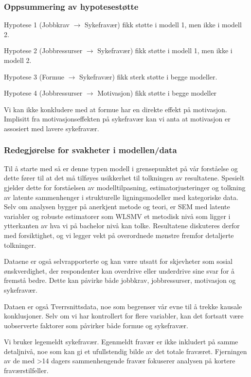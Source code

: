 \documentclass[
  12pt,
  a4paper,
  DIV=11,
  numbers=noendperiod]{scrartcl}
\begin{document}
\subsubsection{Oppsummering av
hypotesestøtte}\label{oppsummering-av-hypotesestuxf8tte}

Hypotese 1 (Jobbkrav \(\rightarrow\) Sykefravær) fikk støtte i modell 1,
men ikke i modell 2.

Hypotese 2 (Jobbressurser \(\rightarrow\) Sykefravær) fikk støtte i
modell 1, men ikke i modell 2.

Hypotese 3 (Formue \(\rightarrow\) Sykefravær) fikk sterk støtte i begge
modeller.

Hypotese 4 (Jobbressurser \(\rightarrow\) Motivasjon) fikk støtte i
begge modeller

Vi kan ikke konkludere med at formue har en direkte effekt på
motivasjon. Implisitt fra motivasjonseffekten på sykefravær kan vi anta
at motivasjon er assosiert med lavere sykefravær.

\subsubsection{Redegjørelse for svakheter i
modellen/data}\label{redegjuxf8relse-for-svakheter-i-modellendata}

Til å starte med så er denne typen modell i grensepunktet på vår
forståelse og dette fører til at det må tilføyes usikkerhet til
tolkningen av resultatene. Spesielt gjelder dette for forståelsen av
modelltilpasning, estimatorjusteringer og tolkning av latente
sammenhenger i strukturelle ligningsmodeller med kategoriske data. Selv
om analysen bygger på anerkjent metode og teori, er SEM med latente
variabler og robuste estimatorer som WLSMV et metodisk nivå som ligger i
ytterkanten av hva vi på bachelor nivå kan tolke. Resultatene diskuteres
derfor med forsiktighet, og vi legger vekt på overordnede mønstre
fremfor detaljerte tolkninger.

Dataene er også selvrapporterte og kan være utsatt for skjevheter som
sosial ønskverdighet, der respondenter kan overdrive eller underdrive
sine svar for å fremstå bedre. Dette kan påvirke både jobbkrav,
jobbressurser, motivasjon og sykefravær.

Dataen er også Tverrsnittsdata, noe som begrenser vår evne til å trekke
kausale konklusjoner. Selv om vi har kontrollert for flere variabler,
kan det fortsatt være uobserverte faktorer som påvirker både formue og
sykefravær.

Vi bruker legemeldt sykefravær. Egenmeldt fravær er ikke inkludert på
samme detaljnivå, noe som kan gi et ufullstendig bilde av det totale
fraværet. Fjerningen av de med \textgreater14 dagers sammenhengende
fravær fokuserer analysen på kortere fraværstilfeller.
\end{document}
